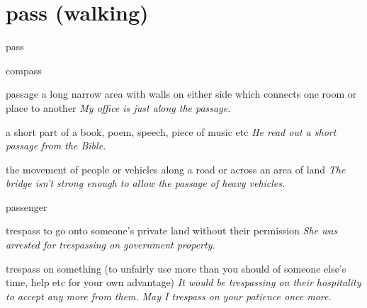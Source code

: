 \chapter{pass (walking)}

\begin{word}{pass}
\end{word}

\begin{word}{compass}
\end{word}

\begin{word}{passage}
    a long narrow area with walls on either side which connects one room or place to another
    \textit{My office is just along the passage.}

    a short part of a book, poem, speech, piece of music etc
    \textit{He read out a short passage from the Bible.}

    the movement of people or vehicles along a road or across an area of land
    \textit{The bridge isn’t strong enough to allow the passage of heavy vehicles.}
\end{word}

\begin{word}{passenger}
\end{word}

\begin{word}{trespass}
    to go onto someone’s private land without their permission
    \textit{She was arrested for trespassing on government property.}

    trespass on something (to unfairly use more than you should of someone else’s time, help etc for your own advantage)
    \textit{It would be trespassing on their hospitality to accept any more from them.}
    \textit{May I trespass on your patience once more.}
\end{word}